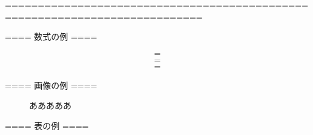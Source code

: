 \documentclass[12pt,a4j]{jarticle}
\begin{document}
\fi






============================================================================

==== 数式の例 ====

\begin{eqnarray}
	&	=	&	\\
	&	=	&	\nonumber \\
	&	=	&	
\end{eqnarray}


==== 画像の例 ====

\begin{figure}[H]
	\centering
	\caption{あああああ}
	\label{aaaaaa}
\end{figure}


==== 表の例 ====
\end{document}
